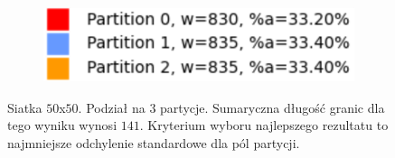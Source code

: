 \begin{figure}[h]
\centering
\begin{subfigure}{.33\textwidth}
    \centering
    \caption[short]{}
\end{subfigure}%
\begin{subfigure}{.33\textwidth}
    \centering
    \caption[short]{}
\end{subfigure}%
\begin{subfigure}{.33\textwidth}
    \centering
    \includegraphics[width=0.9\linewidth]{images/results/m_k/with/8/results}
    \caption[short]{}
\end{subfigure}
\caption{Siatka $50$x$50$. Podział na $3$ partycje. Sumaryczna długość granic dla tego wyniku wynosi $141$.
Kryterium wyboru najlepszego rezultatu to najmniejsze odchylenie standardowe dla pól partycji.}
\label{result:8}
\end{figure}

